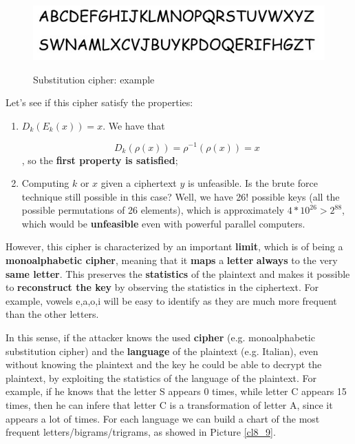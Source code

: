 \begin{figure}[h!]
        \centering
        \includegraphics[scale = 1.2]{img/cl7.jpg}
        \label{cl7}
        \caption{Substitution cipher: example}
\end{figure}

Let's see if this cipher satisfy the properties:

\begin{enumerate}
    \item $D_k(E_k(x)) = x$. We have that

    $$
    D_k(\rho(x)) = \rho^{-1}(\rho(x)) = x
    $$
    , so the \textbf{first property is satisfied};
    \item Computing $k$ or $x$ given a ciphertext $y$ is unfeasible. Is the brute force technique still possible in this case? Well, we have 26! possible keys (all the possible permutations of 26 elements), which is approximately $4 * 10^{26} > 2^{88}$, which would be \textbf{unfeasible} even with powerful parallel computers.
\end{enumerate}

However, this cipher is characterized by an important \textbf{limit}, which is of being a \textbf{monoalphabetic cipher}, meaning that it \textbf{maps} a \textbf{letter} \textbf{always} to the very \textbf{same letter}. This preserves the \textbf{statistics} of the plaintext and makes it possible to \textbf{reconstruct the key} by observing the statistics in the ciphertext. For example, vowels e,a,o,i will be easy to identify as they are much more frequent than the other letters.

In this sense, if the attacker knows the used \textbf{cipher} (e.g. monoalphabetic substitution cipher) and the \textbf{language} of the plaintext (e.g. Italian), even without knowing the plaintext and the key he could be able to decrypt the plaintext, by exploiting the statistics of the language of the plaintext. For example, if he knows that the letter S appears 0 times, while letter C appears 15 times, then he can infere that letter C is a transformation of letter A, since it appears a lot of times. For each language we can build a chart of the most frequent letters/bigrams/trigrams, as showed in Picture \ref{cl8_9}.

